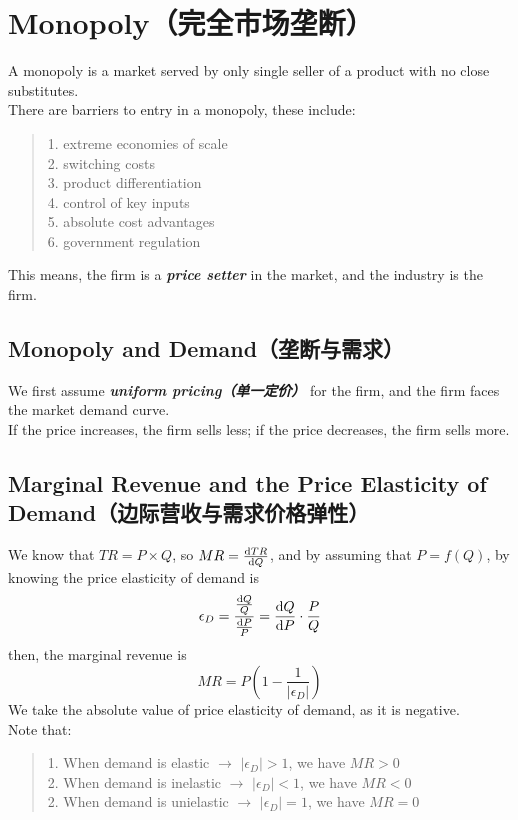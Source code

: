 \section{Monopoly（完全市场垄断）}
A monopoly is a market served by only single seller of a product with no close substitutes. \\
There are barriers to entry in a monopoly, these include: 
\begin{quote}
    1. extreme economies of scale \\
    2. switching costs \\
    3. product differentiation \\
    4. control of key inputs \\
    5. absolute cost advantages \\
    6. government regulation    
\end{quote}
This means, the firm is a \textbf{\textit{price setter}} in the market, and the industry is the firm.

\subsection{Monopoly and Demand（垄断与需求）}
We first assume \textbf{\textit{uniform pricing（单一定价）}} for the firm, and the firm faces the market demand curve. \\
If the price increases, the firm sells less; if the price decreases, the firm sells more.

\subsection{Marginal Revenue and the Price Elasticity of Demand（边际营收与需求价格弹性）}
We know that $TR = P \times Q$, so $MR = \dv{TR}{Q}$, and by assuming that $P = f(Q)$, by knowing the price elasticity of demand is 
$$\epsilon_D = \frac{\frac{\dd Q}{Q}}{\frac{\dd P}{P}} = \dv{Q}{P} \cdot \frac{P}{Q}$$
then, the marginal revenue is
$$MR = P(1 - \frac{1}{|\epsilon_D|})$$
We take the absolute value of price elasticity of demand, as it is negative. \\
Note that:
\begin{quote}
    1. When demand is elastic $\to$ $|\epsilon_D| > 1$, we have $MR > 0$ \\
    2. When demand is inelastic $\to$ $|\epsilon_D| < 1$, we have $MR < 0$ \\
    2. When demand is unielastic $\to$ $|\epsilon_D| = 1$, we have $MR = 0$
\end{quote}

